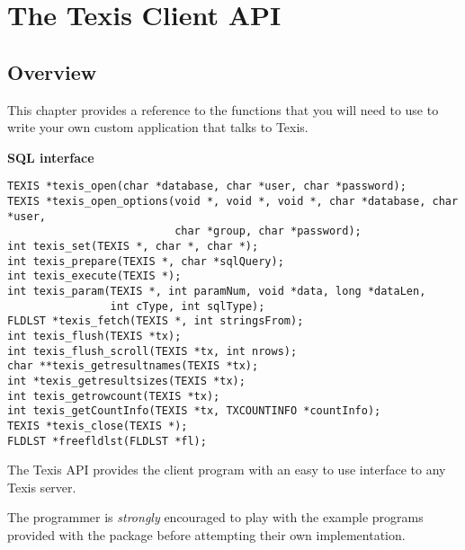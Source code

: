 

\chapter{The Texis Client API}{\label{Part:V:Chp:tcapi}}{\label{Part:V:Chp:Embed}}
\section{Overview}
This chapter provides a reference to the functions that you will need to
use to write your own custom application that talks to Texis.

\SYNOPSIS

{\bf SQL interface}
\begin{verbatim}
TEXIS *texis_open(char *database, char *user, char *password);
TEXIS *texis_open_options(void *, void *, void *, char *database, char *user,
                          char *group, char *password);
int texis_set(TEXIS *, char *, char *);
int texis_prepare(TEXIS *, char *sqlQuery);
int texis_execute(TEXIS *);
int texis_param(TEXIS *, int paramNum, void *data, long *dataLen,
                int cType, int sqlType);
FLDLST *texis_fetch(TEXIS *, int stringsFrom);
int texis_flush(TEXIS *tx);
int texis_flush_scroll(TEXIS *tx, int nrows);
char **texis_getresultnames(TEXIS *tx);
int *texis_getresultsizes(TEXIS *tx);
int texis_getrowcount(TEXIS *tx);
int texis_getCountInfo(TEXIS *tx, TXCOUNTINFO *countInfo);
TEXIS *texis_close(TEXIS *);
FLDLST *freefldlst(FLDLST *fl);

\end{verbatim}

\DESCRIPTION

The Texis API provides the client program with an easy to use interface to
any Texis server.

The programmer is {\em strongly} encouraged to play with the example
programs provided with the package before attempting their own
implementation.


